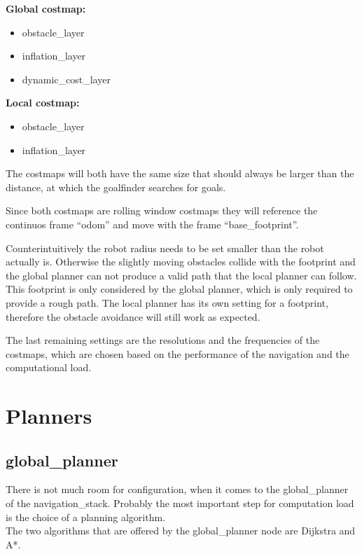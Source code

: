 \textbf{Global costmap:}
\begin{itemize}
	\item obstacle\_layer
	\item inflation\_layer
	\item dynamic\_cost\_layer
\end{itemize}


\textbf{Local costmap:}
\begin{itemize}
	\item obstacle\_layer
	\item inflation\_layer
\end{itemize}

The costmaps will both have the same size that should always be larger than the distance, at which the goalfinder searches for goals.

Since both costmaps are rolling window costmaps they will reference the continuos frame ``odom'' and move with the frame ``base\_footprint''.

Counterintuitively the robot radius needs to be set smaller than the robot actually is. Otherwise the slightly moving obstacles collide with the footprint and the global planner can not produce a valid path that the local planner can follow.\\
This footprint is only considered by the global planner, which is only required to provide a rough path. The local planner has its own setting for a footprint, therefore the obstacle avoidance will still work as expected.

The last remaining settings are the resolutions and the frequencies of the costmaps, which are chosen based on the performance of the navigation and the computational load.


\section{Planners}

\subsection{global\_planner}
\label{globalplannertest}
There is not much room for configuration, when it comes to the global\_planner of the navigation\_stack. Probably the most important step for computation load is the choice of a planning algorithm.\\
The two algorithms that are offered by the global\_planner node are Dijkstra and A*.\\

